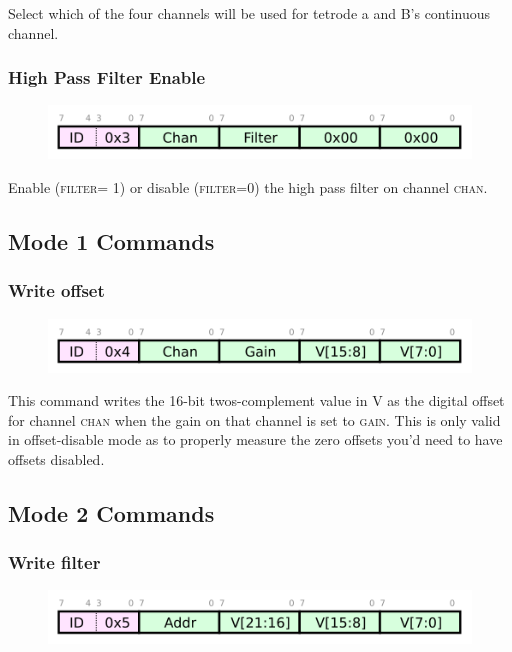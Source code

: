 Select which of the four channels will be used for tetrode a and B's continuous channel. 

\subsubsection{High Pass Filter Enable}
\begin{figure}[h!]
\includegraphics[scale=1.5]{setfilter.cmd.svg}
\end{figure}

Enable (\textsc{filter}= 1) or disable (\textsc{filter}=0) the high pass filter on channel \textsc{chan}. 


\subsection{Mode 1 Commands}
\subsubsection{Write offset}
\begin{figure}[h!]
\includegraphics[scale=1.5]{writeos.cmd.svg}
\end{figure}

This command writes the 16-bit twos-complement value in V as the
digital offset for channel \textsc{chan} when the gain on that channel
is set to \textsc{gain}. This is only valid in offset-disable mode as
to properly measure the zero offsets you'd need to have offsets
disabled.

\subsection{Mode 2 Commands}
\subsubsection{Write filter}
\begin{figure}[h!]
\includegraphics[scale=1.5]{writefil.cmd.svg}
\end{figure}

